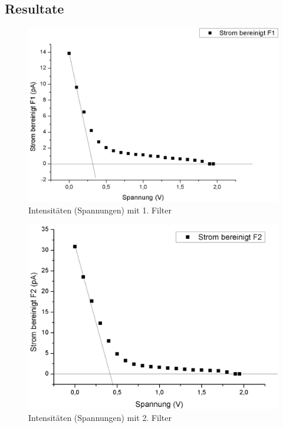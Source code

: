 \documentclass[12pt,a4paper]{article}
\begin{document}
\subsection{Resultate}


\begin{figure}[H]
	\centering
	\includegraphics[scale=0.45]{./data/Filter1.png}
	\caption{Intensitäten (Spannungen) mit 1. Filter}
	\label{fig:filter1}
\end{figure}

\begin{figure}[H]
	\centering
	\includegraphics[scale=0.5]{./data/Filter2.png}
	\caption{Intensitäten (Spannungen) mit 2. Filter}
	\label{fig:filter2}
\end{figure}
\end{document}
